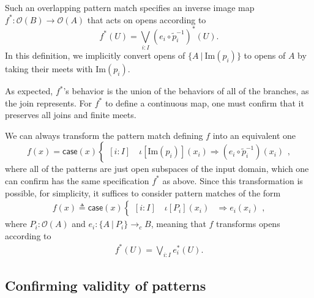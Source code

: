 \documentclass[conference]{IEEEtran}
\newcommand{\cto}{\to_c}
\newcommand{\suchthat}{\ |\ }
\newcommand{\Open}[1]{\mathcal{O}({#1})}
\newcommand{\Img}[1]{\text{Im}\left({#1}\right)}
\newcommand{\oinclf}[1]{\iota[{#1}]}
\newcommand{\oincl}[2]{\oinclf{#1} \left({#2}\right)}
\newcommand{\Branch}{\Rightarrow}
\newcommand{\iimg}[1]{#1^*}
\begin{document}
Such an overlapping pattern match specifies an inverse image map $\iimg{f} : \Open{B} \to \Open{A}$ that acts on opens according to
\[
\iimg{f}(U) = \bigvee_{i : I} \iimg{(e_i \circ \tilde{p}_i^{-1})}(U).
\]
In this definition, we implicitly convert opens of $\{ A \suchthat \Img{p_i} \}$ to opens of $A$ by taking their meets with $\Img{p_i}$.

As expected, $\iimg{f}$'s behavior is the union of the behaviors of all of the branches, as the join represents. For $\iimg{f}$ to define a continuous map, one must confirm that it preserves all joins and finite meets.

We can always transform the pattern match defining $f$ into an equivalent one
\[
f(x) = \mathsf{case}(x)
\begin{cases}
[i : I] \quad \oincl{\Img{p_i}}{x_i} \Branch (e_i \circ \tilde{p}_i^{-1})(x_i)
\end{cases},
\]
where all of the patterns are just open subspaces of the input domain, which one can confirm has the same specification $\iimg{f}$ as above. Since this transformation is possible, for simplicity, it suffices to consider pattern matches of the form
\begin{align}
\label{eq:pattern}
f(x) \triangleq \mathsf{case}(x)
\begin{cases}
[i : I] \quad \oincl{P_i}{x_i} &\Branch e_i(x_i)
\end{cases},
\end{align}
where $P_i : \Open{A}$ and $e_i : \{ A \suchthat P_i \} \cto B$, meaning that $f$ transforms opens according to
\begin{align}
\label{eq:iimg}
\iimg{f}(U) = \bigvee_{i : I} \iimg{e_i}(U).
\end{align}

\subsection{Confirming validity of patterns}
\end{document}
